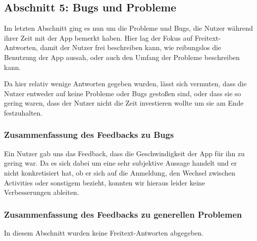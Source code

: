     \newpage

    \subsection{Abschnitt 5: Bugs und Probleme}

        Im letzten Abschnitt ging es nun um die Probleme und Bugs, die Nutzer während ihrer Zeit mit der App bemerkt haben. Hier lag der Fokus auf Freitext-Antworten, damit der Nutzer frei beschreiben kann, wie reibungslos die Benutzung der App aussah, oder auch den Umfang der Probleme beschreiben kann.

        Da hier relativ wenige Antworten gegeben wurden, lässt sich vermuten, dass die Nutzer entweder auf keine Probleme oder Bugs gestoßen sind, oder dass sie so gering waren, dass der Nutzer nicht die Zeit investieren wollte um sie am Ende festzuhalten.

        \subsubsection{Zusammenfassung des Feedbacks zu Bugs}

            Ein Nutzer gab uns das Feedback, dass die Geschwindigkeit der App für ihn zu gering war. Da es sich dabei um eine sehr subjektive Aussage handelt und er nicht konkretisiert hat, ob er sich auf die Anmeldung, den Wechsel zwischen Activities oder sonstigem bezieht, konnten wir hieraus leider keine Verbesserungen ableiten.

        \subsubsection{Zusammenfassung des Feedbacks zu generellen Problemen}

            In diesem Abschnitt wurden keine Freitext-Antworten abgegeben.
